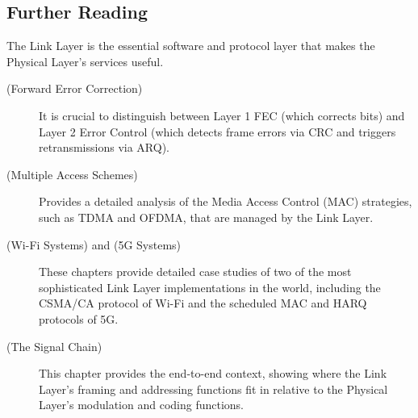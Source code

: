 \begin{importantbox}
\section*{Further Reading}
The Link Layer is the essential software and protocol layer that makes the Physical Layer's services useful.
\begin{description}
    \item[ (Forward Error Correction)] It is crucial to distinguish between Layer 1 FEC (which corrects bits) and Layer 2 Error Control (which detects frame errors via CRC and triggers retransmissions via ARQ).
    \item[ (Multiple Access Schemes)] Provides a detailed analysis of the Media Access Control (MAC) strategies, such as TDMA and OFDMA, that are managed by the Link Layer.
    \item[ (Wi-Fi Systems) and  (5G Systems)] These chapters provide detailed case studies of two of the most sophisticated Link Layer implementations in the world, including the CSMA/CA protocol of Wi-Fi and the scheduled MAC and HARQ protocols of 5G.
    \item[ (The Signal Chain)] This chapter provides the end-to-end context, showing where the Link Layer's framing and addressing functions fit in relative to the Physical Layer's modulation and coding functions.
\end{description}
\end{importantbox}